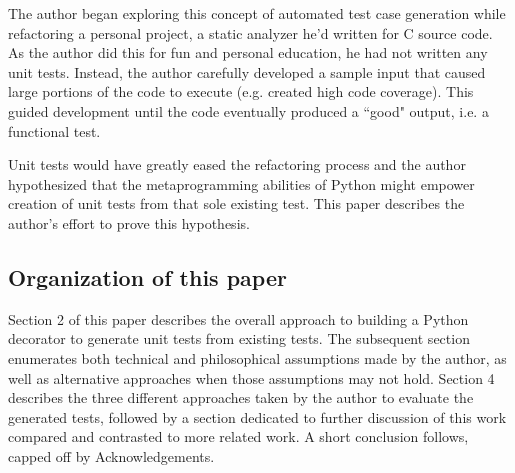 The author began exploring this concept of automated test case generation
while refactoring a personal project, a static analyzer he'd written for C source code.  As the
author did this for fun and personal education, he had not written any unit
tests.  Instead, the author carefully developed a sample input that caused large
portions of the code to execute (e.g. created high code coverage).  This guided
development until the code eventually produced a “good" output, i.e. a functional
test.
  
Unit tests would have greatly eased the refactoring process and the author 
hypothesized that the metaprogramming abilities of Python might empower creation
of unit tests from that sole existing test. This paper describes the author's
effort to prove this hypothesis.

\subsection{Organization of this paper}\label{sec:intro-5}

Section 2 of this paper describes the overall approach to building a
Python decorator to generate unit tests from existing tests. The subsequent
section enumerates both technical and philosophical assumptions made by the
author, as well as alternative approaches when those assumptions may not hold.
Section 4 describes the three different approaches taken by the author to 
evaluate the generated tests, followed by a section dedicated to further 
discussion of this work compared and contrasted to more related work.  A short
conclusion follows, capped off by Acknowledgements.

